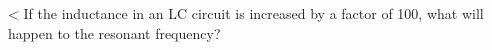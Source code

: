<%
If the inductance in an LC circuit is increased by a factor of 100,
what will happen to the resonant frequency?
